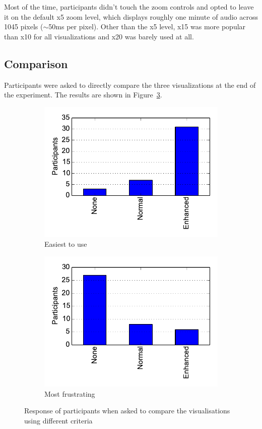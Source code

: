 Most of the time, participants didn't touch the zoom controls and opted to leave it on the default x5 zoom level, which
displays roughly one minute of audio across 1045 pixels ($\sim$50ms per pixel). Other than the x5 level, x15 was more
popular than x10 for all visualizations and x20 was barely used at all.

\subsection{Comparison}
Participants were asked to directly compare the three visualizations at the end of the experiment. The results are
shown in Figure~\ref{fig:compare}.

\begin{figure}[ht]
\centering
\begin{subfigure}{.5\textwidth}
  \centering
  \includegraphics[width=\textwidth]{figs/easiest.pdf}
  \caption{Easiest to use}
  \label{fig:easiest}
\end{subfigure}%
\begin{subfigure}{.5\textwidth}
  \centering
  \includegraphics[width=\linewidth]{figs/frustrating.pdf}
  \caption{Most frustrating}
  \label{fig:frustrating}
\end{subfigure}
\caption{Response of participants when asked to compare the visualisations
  using different criteria}
\label{fig:compare}
\end{figure}

